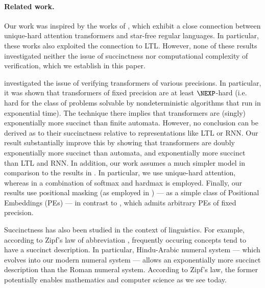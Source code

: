 \paragraph{Related work.} Our work was inspired by the works of 
\cite{YangCA24,barcelo2024logical,tale,LC25}, which exhibit a close connection
between unique-hard attention transformers and star-free regular languages.
In particular, these works also exploited the connection to LTL. However,
none of these results investigated neither the issue of succinctness nor
computational complexity of verification, which we establish in this
paper.

\cite{SAL25} investigated the issue of verifying transformers of various
precisions. In particular, it was shown that transformers of fixed precision
are at least $\NEXP$-hard (i.e. hard for the class of problems solvable by
nondeterministic algorithms that run in exponential time). The technique there
implies that transformers are (singly) exponentially more succinct than finite
automata. However, no conclusion can be derived as to their succinctness
relative to representations like LTL or RNN. Our result substantially improve
this by showing that transformers are doubly exponentially more succinct than 
automata, and exponentially more succinct than LTL and RNN. In addition, our
work assumes a much simpler model in comparison to the results in \citep{SAL25}. 
In particular, we use unique-hard attention, 
whereas in \citep{SAL25} a combination of softmax and hardmax is employed.
Finally, our results use positional masking (as employed in
\citep{YangCA24,tale,LC25}) --- as a simple class of Positional Embeddings 
(PEs) --- in contrast to \citep{SAL25}, which admits arbitrary PEs of fixed precision.

Succinctness has also been studied in the context of linguistics. For example,
according to Zipf's law of abbreviation \citep{zipf35}, frequently occuring
concepts tend to have a succinct description. In particular, Hindu-Arabic
numeral system --- which evolves into our modern numeral system --- allows
an exponentially more succinct description than the Roman numeral system.
According to Zipf's law, the former potentially enables mathematics and computer
science as we see today.
